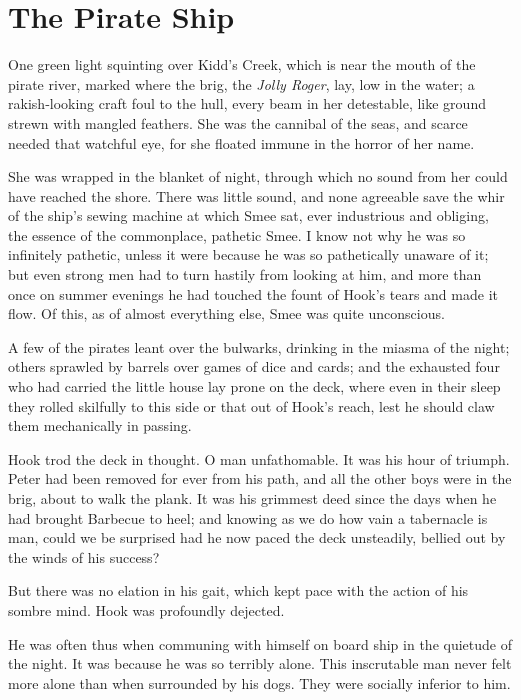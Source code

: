 
\chapter{The Pirate Ship}

One green light squinting over Kidd’s Creek, which is near the mouth of the pirate river,
marked where the brig, the \emph{Jolly Roger}, lay,
low in the water;
a rakish‐looking craft foul to the hull,
every beam in her detestable, like ground strewn with mangled feathers.
She was the cannibal of the seas,
and scarce needed that watchful eye, for she floated immune in the horror of her name.

She was wrapped in the blanket of night,
through which no sound from her could have reached the shore.
There was little sound,
and none agreeable save the whir of the ship’s sewing machine at which Smee sat, ever industrious and obliging,
the essence of the commonplace, pathetic Smee.
I know not why he was so infinitely pathetic,
unless it were because he was so pathetically unaware of it;
but even strong men had to turn hastily from looking at him,
and more than once on summer evenings he had touched the fount of Hook’s tears and made it flow.
Of this, as of almost everything else, Smee was quite unconscious.

A few of the pirates leant over the bulwarks, drinking in the miasma of the night;
others sprawled by barrels over games of dice and cards;
and the exhausted four who had carried the little house lay prone on the deck,
where even in their sleep they rolled skilfully to this side or that out of Hook’s reach,
lest he should claw them mechanically in passing.

Hook trod the deck in thought.
O man unfathomable.
It was his hour of triumph.
Peter had been removed for ever from his path, and all the other boys were in the brig,
about to walk the plank.
It was his grimmest deed since the days when he had brought Barbecue to heel;
and knowing as we do how vain a tabernacle is man,
could we be surprised had he now paced the deck unsteadily,
bellied out by the winds of his success?

But there was no elation in his gait, which kept pace with the action of his sombre mind.
Hook was profoundly dejected.

He was often thus when communing with himself on board ship in the quietude of the night.
It was because he was so terribly alone.
This inscrutable man never felt more alone than when surrounded by his dogs.
They were socially inferior to him.

